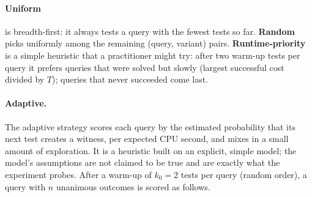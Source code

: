 \documentclass[11pt]{article}
\begin{document}
\paragraph{Uniform} is breadth-first: it always tests a query with the fewest tests so far. \textbf{Random} picks uniformly among the remaining (query, variant) pairs. \textbf{Runtime-priority} is a simple heuristic that a practitioner might try: after two warm-up tests per query it prefers queries that were solved but slowly (largest successful cost divided by $T$); queries that never succeeded come last.

\paragraph{Adaptive.} The adaptive strategy scores each query by the estimated probability that its next test creates a witness, per expected CPU second, and mixes in a small amount of exploration. It is a heuristic built on an explicit, simple model; the model's assumptions are not claimed to be true and are exactly what the experiment probes. After a warm-up of $k_0=2$ tests per query (random order), a query with $n$ unanimous outcomes is scored as follows.
\end{document}
